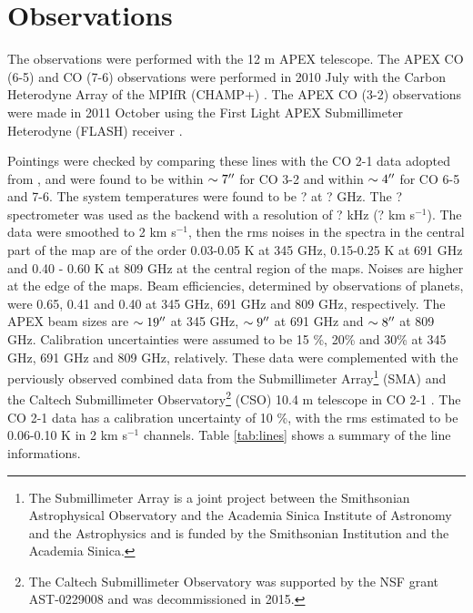 \section{Observations}

The observations were performed with the 12 m APEX telescope. The APEX CO (6-5) and CO (7-6) observations were
performed in 2010 July with the Carbon Heterodyne Array of the MPIfR (CHAMP+) \citep{2006SPIE.6275E..0NK}. The APEX CO (3-2) observations were made in 2011 October using the First Light APEX Submillimeter Heterodyne (FLASH) receiver \citep{2006A&A...454L..21H}.

Pointings were checked by comparing these lines with the CO 2-1 data adopted from \citet{2009ApJ...696...66Q}, and were found to be within $\sim 7\mbox{$^{\prime\prime}$}$ for CO 3-2 and within $\sim 4\mbox{$^{\prime\prime}$}$ for CO 6-5 and 7-6. The system temperatures were found to be ? at ? GHz. The ? spectrometer was used as the backend with a resolution of ? kHz (? km s$^{-1}$). The data were smoothed to 2 km s$^{-1}$, then the rms noises in the spectra in the central part of the map are of the order 0.03-0.05 K at 345 GHz, 0.15-0.25 K at 691 GHz and 0.40 - 0.60 K at 809 GHz at the central region of the maps. Noises are higher at the edge of the maps. Beam efficiencies, determined by observations of planets, were 0.65, 0.41 and 0.40 at 345 GHz, 691 GHz and 809 GHz, respectively. The APEX beam sizes are $\sim 19\mbox{$^{\prime\prime}$}$ at 345 GHz, $\sim 9\mbox{$^{\prime\prime}$}$ at 691 GHz and $\sim 8\mbox{$^{\prime\prime}$}$ at 809 GHz. Calibration uncertainties were assumed to be 15 \%, 20\% and 30\% at 345 GHz, 691 GHz and 809 GHz, relatively. These data were complemented with the perviously observed combined data from the Submillimeter Array\footnote{    The Submillimeter Array is a joint project between the Smithsonian Astrophysical Observatory and the Academia Sinica Institute of Astronomy and the Astrophysics and is funded by the Smithsonian Institution and the Academia Sinica.} (SMA) and the Caltech Submillimeter Observatory\footnote{    The Caltech Submillimeter Observatory was supported by the NSF grant AST-0229008 and was decommissioned in 2015.} (CSO) 10.4 m telescope in CO 2-1 \citep{2009ApJ...696...66Q}. The CO 2-1 data has a calibration uncertainty of 10 \%, with the rms estimated to be 0.06-0.10 K in 2 km s$^{-1}$ channels. Table \ref{tab:lines} shows a summary of the line informations.


